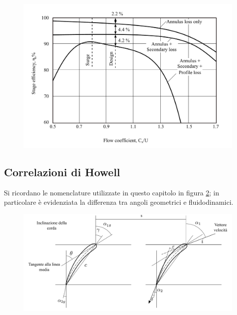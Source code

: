 \begin{figure}
\centering
  \includegraphics[width=\textwidth]{fig/ComprStageLoss.pdf}
\caption{}
\label{fig:ComprStageLoss}
\end{figure}
\subsection{Correlazioni di Howell}
Si ricordano le nomenclature utilizzate in questo capitolo in figura \ref{fig:SchieraDim}; in particolare è evidenziata la differenza tra angoli geometrici e fluidodinamici.
\begin{figure}
	\centering
	\includegraphics[width=\textwidth]{fig/SchieraDim.pdf}
	\caption{}
	\label{fig:SchieraDim}
\end{figure}

